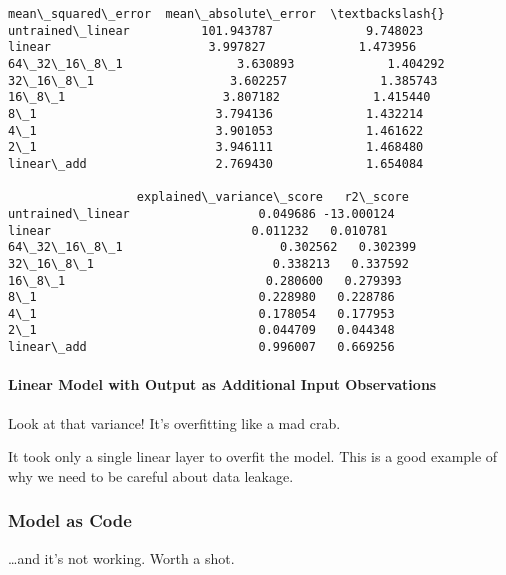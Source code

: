 \documentclass[11pt]{article}
\makeatletter
\newcommand{\boxspacing}{\kern\kvtcb@left@rule\kern\kvtcb@boxsep}
\newcommand{\prompt}[4]{
        {\ttfamily\llap{{\color{#2}[#3]:\hspace{3pt}#4}}\vspace{-\baselineskip}}
    }
\makeatother
\begin{document}
            \begin{tcolorbox}[breakable, size=fbox, boxrule=.5pt, pad at break*=1mm, opacityfill=0]
\prompt{Out}{outcolor}{112}{\boxspacing}
\begin{Verbatim}[commandchars=\\\{\}]
                  mean\_squared\_error  mean\_absolute\_error  \textbackslash{}
untrained\_linear          101.943787             9.748023
linear                      3.997827             1.473956
64\_32\_16\_8\_1                3.630893             1.404292
32\_16\_8\_1                   3.602257             1.385743
16\_8\_1                      3.807182             1.415440
8\_1                         3.794136             1.432214
4\_1                         3.901053             1.461622
2\_1                         3.946111             1.468480
linear\_add                  2.769430             1.654084

                  explained\_variance\_score   r2\_score
untrained\_linear                  0.049686 -13.000124
linear                            0.011232   0.010781
64\_32\_16\_8\_1                      0.302562   0.302399
32\_16\_8\_1                         0.338213   0.337592
16\_8\_1                            0.280600   0.279393
8\_1                               0.228980   0.228786
4\_1                               0.178054   0.177953
2\_1                               0.044709   0.044348
linear\_add                        0.996007   0.669256
\end{Verbatim}
\end{tcolorbox}
        
    \paragraph{Linear Model with Output as Additional Input
Observations}\label{linear-model-with-output-as-additional-input-observations}

Look at that variance! It's overfitting like a mad crab.

It took only a single linear layer to overfit the model. This is a good
example of why we need to be careful about data leakage.

    \subsubsection{Model as Code}\label{model-as-code}

\ldots and it's not working. Worth a shot.
\end{document}
